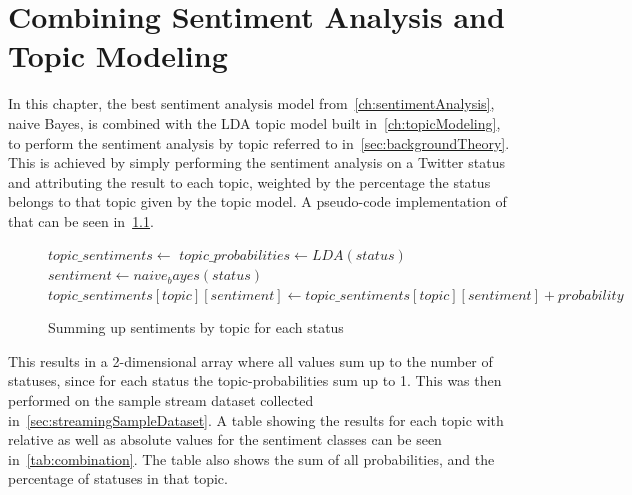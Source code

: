\chapter{Combining Sentiment Analysis and Topic Modeling}
\label{ch:combiningSentimentAnalysisAndTopicModeling}


In this chapter, the best sentiment analysis model from~\cref{ch:sentimentAnalysis}, naive Bayes,
is combined with the LDA topic model built in~\cref{ch:topicModeling},
to perform the sentiment analysis by topic referred to in~\cref{sec:backgroundTheory}.
\\
This is achieved by simply performing the sentiment analysis on a Twitter status and attributing the result to each topic,
weighted by the percentage the status belongs to that topic given by the topic model.
A pseudo-code implementation of that can be seen in~\cref{pseudo_code:sentiment_topic_summing}.

\begin{figure}
    \caption{Summing up sentiments by topic for each status}
    \label{pseudo_code:sentiment_topic_summing}
    \begin{algorithmic}
        \State $topic\_sentiments \gets {}$ %
            \State $topic\_probabilities \gets LDA(status)$
            \State $sentiment \gets naive_bayes(status)$
                \State $topic\_sentiments[topic][sentiment]
                    \gets topic\_sentiments[topic][sentiment] + probability$
            \EndFor
        \EndFor
    \end{algorithmic}
\end{figure}

This results in a 2-dimensional array where all values sum up to the number of statuses,
since for each status the topic-probabilities sum up to 1.
This was then performed on the sample stream dataset collected in~\cref{sec:streamingSampleDataset}.
A table showing the results for each topic with relative as well as absolute values for the sentiment classes can be seen in~\cref{tab:combination}.
The table also shows the sum of all probabilities, and the percentage of statuses in that topic.

